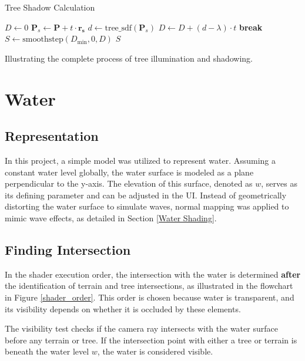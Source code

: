 \begin{algorithm}
\caption{Tree Shadow Calculation}
\label{algo: tree shadow}
\begin{algorithmic}
    \State $D \gets 0$
        \State $\mathbf{P}_s \gets \mathbf{P} + t \cdot \mathbf{r_s}$
        \State $d \gets \text{tree\_sdf}(\mathbf{P}_s)$
            \State $D \gets D + (d - \lambda) \cdot t$
        \EndIf
            \State \textbf{break}
        \EndIf
    \EndFor
    \State $S \gets \text{smoothstep}(D_{\text{min}}, 0, D)$
    \State \Return $S$
\EndFunction
\end{algorithmic}
\end{algorithm}

{Illustrating the complete process of tree illumination and shadowing.}

\section{Water}

\subsection{Representation}

In this project, a simple model was utilized to represent water. Assuming a constant water level globally, the water surface is modeled as a plane perpendicular to the y-axis. The elevation of this surface, denoted as $w$, serves as its defining parameter and can be adjusted in the UI. Instead of geometrically distorting the water surface to simulate waves, normal mapping was applied to mimic wave effects, as detailed in Section \ref{Water Shading}.

\subsection{Finding Intersection}

In the shader execution order, the intersection with the water is determined \textbf{after} the identification of terrain and tree intersections, as illustrated in the flowchart in Figure \ref{shader_order}. This order is chosen because water is transparent, and its visibility depends on whether it is occluded by these elements.

The visibility test checks if the camera ray intersects with the water surface before any terrain or tree. If the intersection point with either a tree or terrain is beneath the water level $w$, the water is considered visible.

